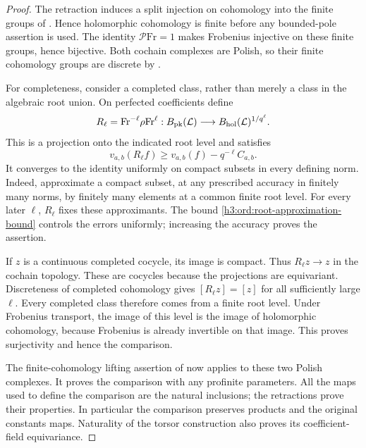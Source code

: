 \begin{proof}
The retraction induces a split injection on cohomology into the finite
groups of .  Hence holomorphic
cohomology is finite before any bounded-pole assertion is used.
The identity $\mathcal P\mathrm{Fr}=1$ makes Frobenius injective
on these finite groups, hence bijective.  Both cochain complexes are
Polish, so their finite cohomology groups are discrete by
.

For completeness, consider a completed class, rather than merely a
class in the algebraic root union.  On perfected coefficients define
\[
 R_\ell=\mathrm{Fr}^{-\ell}\rho\mathrm{Fr}^{\ell}:
 B_{\mathrm{pk}}(\mathcal L)\longrightarrow
 B_{\mathrm{hol}}(\mathcal L)^{1/q^\ell}.
\]
This is a projection onto the indicated root level and satisfies
\begin{equation}\label{h3:ord:root-approximation-bound}
 v_{a,b}(R_\ell f)\geq v_{a,b}(f)-q^{-\ell}C_{a,b}.
\end{equation}
It converges to the identity uniformly on compact subsets in every
defining norm.  Indeed, approximate a compact subset, at any prescribed
accuracy in finitely many norms, by finitely many elements at a common
finite root level.  For every later $\ell$, $R_\ell$ fixes these
approximants.  The bound \eqref{h3:ord:root-approximation-bound} controls
the errors uniformly; increasing the accuracy proves the assertion.

If $z$ is a continuous completed cocycle, its image is compact.
Thus $R_\ell z\to z$ in the cochain topology.  These are cocycles
because the projections are equivariant.  Discreteness of completed
cohomology gives $[R_\ell z]=[z]$ for all sufficiently large $\ell$.
Every completed class therefore comes from a finite root level.
Under Frobenius transport, the image of this level is the image of
holomorphic cohomology, because Frobenius is already invertible on
that image.  This proves surjectivity and hence the comparison.

The finite-cohomology lifting assertion of 
now applies to these two Polish complexes.  It proves the comparison
with any profinite parameters.  All the maps used to define the
comparison are the natural inclusions; the retractions prove their
properties.  In particular the comparison preserves products and the
original constants maps.  Naturality of the torsor construction also
proves its coefficient-field equivariance.
\end{proof}

